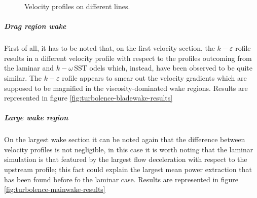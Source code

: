 \documentclass[a4paper,12pt]{article}
\newcommand{\kepsilon}[1]{$k\!-\!\varepsilon $ }
\newcommand{\komegasst}[1]{$k\!-\!\omega \, \text{SST} $ }
\begin{document}
\begin{figure}[H]
\centering
{}
\caption{Velocity profiles on different lines.}
\end{figure}

\subparagraph{Drag region wake}
First of all, it has to be noted that, on the first velocity section, the \kepsilon profile results in a different velocity profile with respect to the profiles outcoming from the laminar and \komegasst models which, instead, have been observed to be quite similar.
The \kepsilon profile appears to smear out the velocity gradients which are supposed to be magnified in the viscosity-dominated wake regions.
Results are represented in figure \ref{fig:turbolence-bladewake-results}

\subparagraph{Large wake region}
On the largest wake section it can be noted again that the difference between velocity profiles is not negligible, in this case it is worth noting that the laminar simulation is that featured by the largest flow deceleration with respect to the upstream profile; this fact could explain the largest mean power extraction that has been found before fo the laminar case.
Results are represented in figure \ref{fig:turbolence-mainwake-results}
\end{document}

